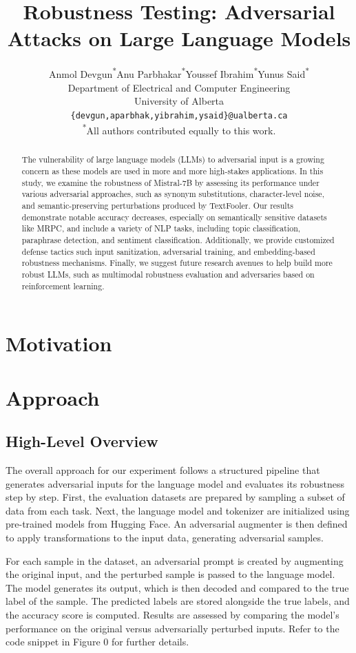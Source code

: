 \documentclass[conference]{IEEEtran}
\title{Robustness Testing: Adversarial Attacks on Large Language Models}
\author{
Anmol Devgun\textsuperscript{*}\quad Anu Parbhakar\textsuperscript{*}\quad Youssef Ibrahim\textsuperscript{*}\quad Yunus Said\textsuperscript{*} \\
Department of Electrical and Computer Engineering \\
University of Alberta \\
\texttt{\{devgun,aparbhak,yibrahim,ysaid\}@ualberta.ca} \\
\textsuperscript{*}All authors contributed equally to this work.
}
\begin{document}
\maketitle

\begin{abstract}
The vulnerability of large language models (LLMs) to adversarial input is a growing concern as these models are used in more and more high-stakes applications.  In this study, we examine the robustness of Mistral-7B by assessing its performance under various adversarial approaches, such as synonym substitutions, character-level noise, and semantic-preserving perturbations produced by TextFooler.  Our results demonstrate notable accuracy decreases, especially on semantically sensitive datasets like MRPC, and include a variety of NLP tasks, including topic classification, paraphrase detection, and sentiment classification.  Additionally, we provide customized defense tactics such input sanitization, adversarial training, and embedding-based robustness mechanisms.  Finally, we suggest future research avenues to help build more robust LLMs, such as multimodal robustness evaluation and adversaries based on reinforcement learning.
\end{abstract}


\section{Motivation}


\section{Approach}

\subsection{High-Level Overview}

The overall approach for our experiment follows a structured pipeline that generates adversarial inputs for the language model and evaluates its robustness step by step. First, the evaluation datasets are prepared by sampling a subset of data from each task. Next, the language model and tokenizer are initialized using pre-trained models from Hugging Face. An adversarial augmenter is then defined to apply transformations to the input data, generating adversarial samples.

For each sample in the dataset, an adversarial prompt is created by augmenting the original input, and the perturbed sample is passed to the language model. The model generates its output, which is then decoded and compared to the true label of the sample. The predicted labels are stored alongside the true labels, and the accuracy score is computed. Results are assessed by comparing the model's performance on the original versus adversarially perturbed inputs. Refer to the code snippet in Figure 0 for further details.
\end{document}
